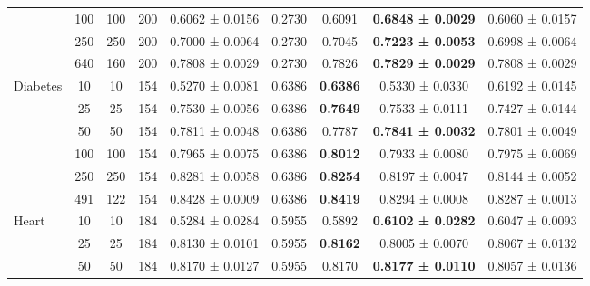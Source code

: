 \begin{table}
{\begin{tabular}[H]{@{}lcccccccc@{}}
                              & 100   & 100  & 200  & 0.6062 ± 0.0156      & 0.2730               & 0.6091          & \textbf{0.6848 ± 0.0029} & 0.6060 ± 0.0157          \\
                              & 250   & 250  & 200  & 0.7000 ± 0.0064      & 0.2730               & 0.7045          & \textbf{0.7223 ± 0.0053} & 0.6998 ± 0.0064          \\
                              & 640   & 160  & 200  & 0.7808 ± 0.0029      & 0.2730               & 0.7826          & \textbf{0.7829 ± 0.0029} & 0.7808 ± 0.0029          \\
                              \midrule
\multirow{6}{*}{Diabetes}     & 10    & 10   & 154  & 0.5270 ± 0.0081      & 0.6386               & \textbf{0.6386} & 0.5330 ± 0.0330          & 0.6192 ± 0.0145          \\
                              & 25    & 25   & 154  & 0.7530 ± 0.0056      & 0.6386               & \textbf{0.7649} & 0.7533 ± 0.0111          & 0.7427 ± 0.0144          \\
                              & 50    & 50   & 154  & 0.7811 ± 0.0048      & 0.6386               & 0.7787          & \textbf{0.7841 ± 0.0032} & 0.7801 ± 0.0049          \\
                              & 100   & 100  & 154  & 0.7965 ± 0.0075      & 0.6386               & \textbf{0.8012} & 0.7933 ± 0.0080          & 0.7975 ± 0.0069          \\
                              & 250   & 250  & 154  & 0.8281 ± 0.0058      & 0.6386               & \textbf{0.8254} & 0.8197 ± 0.0047          & 0.8144 ± 0.0052          \\
                              & 491   & 122  & 154  & 0.8428 ± 0.0009      & 0.6386               & \textbf{0.8419} & 0.8294 ± 0.0008          & 0.8287 ± 0.0013          \\
                              \midrule
\multirow{6}{*}{Heart}        & 10    & 10   & 184  & 0.5284 ± 0.0284      & 0.5955               & 0.5892          & \textbf{0.6102 ± 0.0282} & 0.6047 ± 0.0093          \\
                              & 25    & 25   & 184  & 0.8130 ± 0.0101      & 0.5955               & \textbf{0.8162} & 0.8005 ± 0.0070          & 0.8067 ± 0.0132          \\
                              & 50    & 50   & 184  & 0.8170 ± 0.0127      & 0.5955               & 0.8170          & \textbf{0.8177 ± 0.0110} & 0.8057 ± 0.0136          \\

\end{tabular}}
\end{table}
